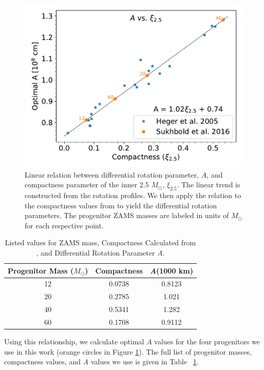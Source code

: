 \documentclass[twocolumn,times]{aastex62}  %
\begin{document}
\begin{figure}[t]
    \centering
    \includegraphics[scale=0.45]{a_vs_compact.pdf}
    \caption{Linear relation between differential rotation parameter, $A$, and compactness parameter of the inner 2.5 $M_\odot$, $\xi_{2.5}$.  The linear trend is constructed from the \citet{heger:2005} rotation profiles.  We then apply the relation to the compactness values from \citet{Suk:2016} to yield the differential rotation parameters.  The progenitor ZAMS masses are labeled in units of $M_\odot$ for each respective point.}
    \label{fig:a_vs_comp}
\end{figure}

\begin{table}[t]
\begin{tabular}{c|c|c}
Progenitor Mass ($M_\odot$) & Compactness & \textit{A}(1000 km) \\
\hline
12  & 0.0738 &         0.8123             \\
20  & 0.2785 &         1.021            \\
40  & 0.5341 &         1.282           \\
60  & 0.1708 &         0.9112          
\end{tabular}
\caption{Listed values for ZAMS mass, Compactness Calculated from \citet{Suk:2016}, and Differential Rotation Parameter \textit{A}.}
\label{table:compact}
\end{table}

Using this relationship, we calculate optimal $A$ values for the four \citet{Suk:2016} progenitors we use in this work (orange circles in Figure \ref{fig:a_vs_comp}).  
The full list of progenitor masses, compactness values, and \textit{A} values we use is given in Table ~\ref{table:compact}.  
\end{document}
